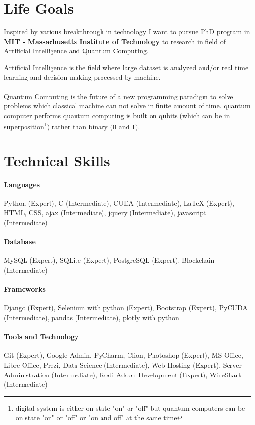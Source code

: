 \documentclass[a4paper, 14pt]{article}
\newcommand{\expert}{{\small (Expert)}}
\newcommand{\intermediate}{\small (Intermediate)}
\begin{document}
	\section*{Life Goals}
	Inspired by various breakthrough in technology I want to pursue PhD program in \href{http://www.mit.edu/about/}{\textbf{MIT - Massachusetts Institute of Technology}} to research in field of Artificial Intelligence and Quantum Computing.
	
	Artificial Intelligence is the field where large dataset is analyzed and/or real time learning and decision making processed by machine. \\
	\\
	\href{https://en.wikipedia.org/wiki/Quantum_computing}{Quantum Computing} is the future of a new programming paradigm to solve problems which classical machine can not solve in finite amount of time. quantum computer performs quantum computing is built on qubits (which can be in superposition\footnote{digital system is either on state "on" or "off" but quantum computers can be on state "on" or "off" or "on and off" at the same time}) rather than binary (0 and 1). 
	
	
	\section*{Technical Skills}
	
	\paragraph{Languages} Python \expert, C \intermediate, CUDA \intermediate, LaTeX \expert, HTML, CSS, ajax \intermediate, jquery \intermediate, javascript \intermediate
	\paragraph{Database} MySQL \expert, SQLite \expert, PostgreSQL \expert, Blockchain \intermediate
	\paragraph{Frameworks} Django \expert, Selenium with python \expert, Bootstrap \expert, PyCUDA \intermediate, pandas \intermediate, plotly with python
	\paragraph{Tools and Technology} Git \expert, Google Admin, PyCharm, Clion, Photoshop \expert, MS Office, Libre Office, Prezi,
	Data Science \intermediate, Web Hosting \expert, Server Administration \intermediate, Kodi Addon Development \expert, WireShark \intermediate
\end{document}
